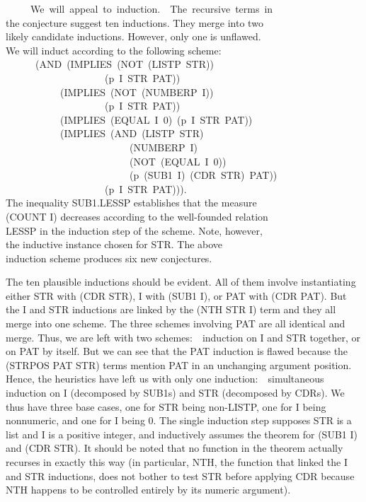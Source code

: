 \documentclass[10pt]{book}
\newenvironment{pubasis}{\begin{flushleft}}{\end{flushleft}}
\begin{document}
\begin{pubasis}
~~~~~We~will~appeal~to~induction.~~The~recursive~terms~in\\
the conjecture suggest ten inductions.  They merge into two\\
likely candidate inductions.  However, only one is unflawed.\\
We will induct according to the following scheme:\\
~~~~~~(AND~(IMPLIES~(NOT~(LISTP~STR))\\
~~~~~~~~~~~~~~~~~~~~(p~I~STR~PAT))\\
~~~~~~~~~~~(IMPLIES~(NOT~(NUMBERP~I))\\
~~~~~~~~~~~~~~~~~~~~(p~I~STR~PAT))\\
~~~~~~~~~~~(IMPLIES~(EQUAL~I~0)~(p~I~STR~PAT))\\
~~~~~~~~~~~(IMPLIES~(AND~(LISTP~STR)\\
~~~~~~~~~~~~~~~~~~~~~~~~~(NUMBERP~I)\\
~~~~~~~~~~~~~~~~~~~~~~~~~(NOT~(EQUAL~I~0))\\
~~~~~~~~~~~~~~~~~~~~~~~~~(p~(SUB1~I)~(CDR~STR)~PAT))\\
~~~~~~~~~~~~~~~~~~~~(p~I~STR~PAT))).\\
The inequality SUB1.LESSP establishes that the measure\\
(COUNT I) decreases according to the well-founded relation\\
LESSP in the induction step of the scheme.  Note, however,\\
the inductive instance chosen for STR.  The above\\
induction scheme produces six new conjectures.\\
\end{pubasis}
The ten plausible inductions should be evident.  All of them involve
instantiating either STR with (CDR STR),
I with (SUB1 I), or PAT with (CDR PAT).  But the I and STR inductions
are linked by the (NTH STR I) term and they all merge into
one scheme.  The three schemes
involving PAT are all identical and merge.  Thus, we are left
with two schemes:~~induction on I and STR together, or on PAT by itself.  But we can see that
the PAT induction is flawed because the (STRPOS PAT STR) terms mention
PAT in an unchanging argument position.  Hence, the heuristics have left us
with only one induction:~~simultaneous induction on I (decomposed by SUB1s) and STR (decomposed
by CDRs).  We thus have three base cases, one for STR being non-LISTP, one for
I being nonnumeric, and one for I being 0.  The single induction step
supposes STR is a list and I is a positive integer, and inductively
assumes the theorem for (SUB1 I) and (CDR STR).  It should be noted that no function in the theorem actually
recurses in exactly this way (in particular, NTH, the function
that linked the I and STR inductions, does not bother to test STR
before applying CDR because NTH happens to be controlled entirely
by its numeric argument).
\end{document}
